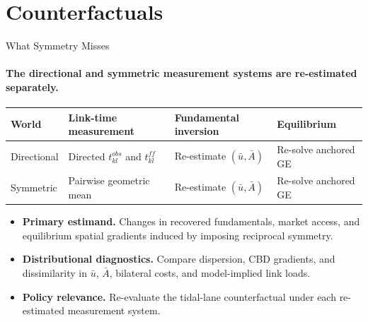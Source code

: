 \documentclass[11pt,aspectratio=169]{beamer}
\begin{document}
\section{Counterfactuals}
\begin{frame}{What Symmetry Misses}
\framesubtitle{The directional and symmetric measurement systems are re-estimated separately.}
\small
\begin{center}
\scriptsize
\begin{tabularx}{0.94\textwidth}{@{}p{}p{}p{}X@{}}
\toprule
World & Link-time measurement & Fundamental inversion & Equilibrium \\
\midrule
Directional & Directed $t_{kl}^{obs}$ and $t_{kl}^{ff}$ & Re-estimate $(\bar u,\bar A)$ & Re-solve anchored GE \\
Symmetric & Pairwise geometric mean & Re-estimate $(\bar u,\bar A)$ & Re-solve anchored GE \\
\bottomrule
\end{tabularx}
\end{center}
\vspace{0.25em}
\begin{itemize}\footnotesize
  \item \textbf{Primary estimand.} Changes in recovered fundamentals, market access, and equilibrium spatial gradients induced by imposing reciprocal symmetry.
  \item \textbf{Distributional diagnostics.} Compare dispersion, CBD gradients, and dissimilarity in $\bar u$, $\bar A$, bilateral costs, and model-implied link loads.
  \item \textbf{Policy relevance.} Re-evaluate the tidal-lane counterfactual under each re-estimated measurement system.
\end{itemize}
\vspace{0.3em}
\begin{center}
\end{center}
\end{frame}
\end{document}
